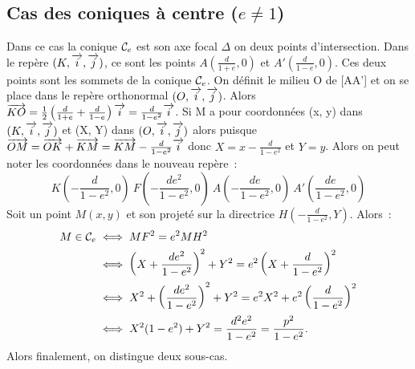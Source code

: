 \subsection{Cas des coniques à centre (\(e\neq 1\))}
Dans ce cas la conique \(\mathcal{C}_{e}\) est son axe focal \(\Delta\) on deux points 
d'intersection. Dans le repère \((K, \overrightarrow{i}, \overrightarrow{j})\), ce sont les points 
\(A(\frac{d}{1 + e},0)\) et \(A'(\frac{d}{1-e},0)\). Ces deux points sont les 
sommets de la conique \(\mathcal{C}_{e}\). On définit le milieu O de [AA'] et on se 
place dans le repère orthonormal \((O,\overrightarrow{i},\overrightarrow{j})\). Alors 
\(\overrightarrow{KO} = \frac{1}{2}\left(\frac{d}{1 + e} + \frac{d}{1-e}\right)\overrightarrow{i} = \frac{d}{1-e^2}\overrightarrow{i}\). 
Si M a pour coordonnées (x, y) dans \((K, \overrightarrow{i}, \overrightarrow{j})\) et (X, Y) dans \((O,\overrightarrow{i},\overrightarrow{j})\) alors 
puisque \(\overrightarrow{OM} = \overrightarrow{OK} + \overrightarrow{KM} = \overrightarrow{KM}-\frac{d}{1-e^2}\overrightarrow{i}\) donc 
\(X = x-\frac{d}{1-e^2}\) et \(Y = y\). Alors on peut noter les coordonnées dans le 
nouveau repère~:
\begin{equation}
  K\left(-\frac{d}{1-e^2},0\right) \ F\left(-\frac{de^2}{1-e^2},0\right) \ 
  A\left(-\frac{de}{1-e^2},0\right) \ A'\left(\frac{de}{1-e^2},0\right)
\end{equation}
Soit un point \(M(x, y)\) et son projeté sur la directrice 
\(H\left(-\frac{d}{1-e^2},Y\right)\). Alors~:
\begin{align}
  M \in \mathcal{C}_{e} &\iff MF^2 = e^2 MH^2\\
                &\iff \left(X + \frac{de^2}{1-e^2}\right)^2 + Y^2 = e^2 
                \left(X + \frac{d}{1-e^2}\right)^2\\
                &\iff X^2 + \left(\frac{de^2}{1-e^2}\right)^2 + Y^2 = e^2 
                X^2 + e^2\left(\frac{d}{1-e^2}\right)^2\\
                &\iff X^2(1-e^2) + Y^2 = \frac{d^2e^2}{1-e^2} = \frac{p^2}{1-e^2}.
\end{align}
Alors finalement, on distingue deux sous-cas.


